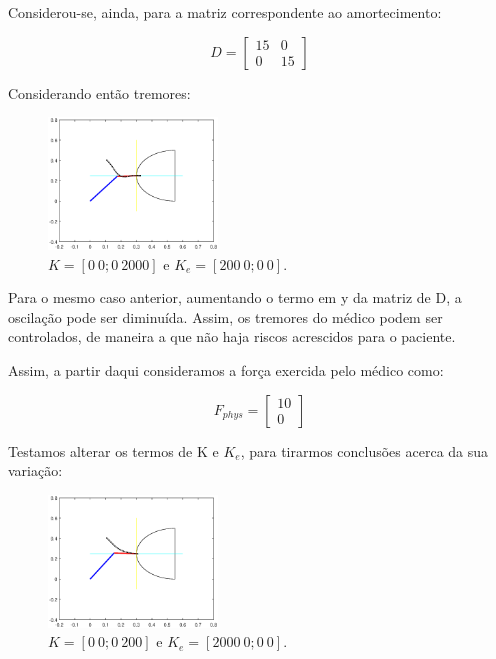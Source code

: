 \documentclass[a4paper,twocolumn,final,11pt]{article}
\begin{document}
Considerou-se, ainda, para a matriz correspondente ao amortecimento:

\begin{equation}
D =
    \begin{bmatrix}
    15 & 0\\
    0 & 15
    \end{bmatrix}
\end{equation}

Considerando então tremores: 

\begin{figure}[H]
	\centering
	\includegraphics[width=0.4\textwidth]{9_oscil_ke200kp2000.eps}
	\caption{$K = \left[0~0 ;0~2000 \right]$ e $K_e = \left[200~0 ;0~0 \right] $.}
  \label{menorp}
\end{figure}

Para o mesmo caso anterior, aumentando o termo em y da matriz de D, a oscilação pode ser diminuída. Assim, os tremores do médico podem ser controlados, de maneira a que não haja riscos acrescidos para o paciente.

Assim, a partir daqui consideramos a força exercida pelo médico como: 

\begin{equation}
F_{phys} =
    \begin{bmatrix}
    10\\
    0
    \end{bmatrix}
\end{equation}

Testamos alterar os termos de K e $K_e$, para tirarmos conclusões acerca da sua variação:

\begin{figure}[H]
	\centering
	\includegraphics[width=0.4\textwidth]{9_ke2000_kp200_fm.eps}
	\caption{$K = \left[0~0 ;0~200 \right]$ e $K_e = \left[2000~0 ;0~0 \right] $.}
  \label{menorp}
\end{figure}
\end{document}
